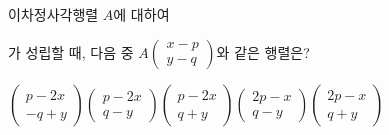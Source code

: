 \hspace*{2mm}\begin{minipage}[t]{\dimexpr\linewidth-2mm\relax}\vspace{0pt}
이차정사각행렬 $A$에 대하여 \par\smallskip{}\par\smallskip\noindent 가 성립할 때, 다음 중 $A\begin{pmatrix} x-p \\ y-q \end{pmatrix}$와 같은 행렬은? 
\begin{choices32}{$\begin{pmatrix} p-2x \\ -q+y \end{pmatrix}$}{$\begin{pmatrix} p-2x \\ q-y \end{pmatrix}$}{$\begin{pmatrix} p-2x \\ q+y \end{pmatrix}$}{$\begin{pmatrix} 2p-x \\ q-y \end{pmatrix}$}{$\begin{pmatrix} 2p-x \\ q+y \end{pmatrix}$}\end{choices32}\end{minipage}
